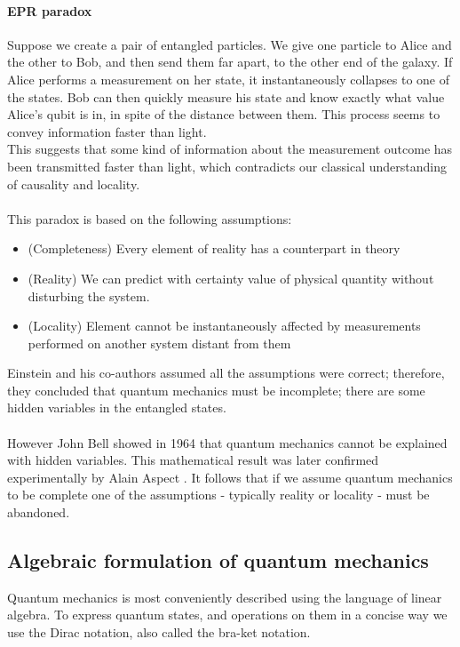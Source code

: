 \paragraph{EPR paradox}

Suppose we create a pair of entangled particles. We give one particle to Alice and the other to Bob, and then send them far apart, to the other end of the galaxy. If Alice performs a measurement on her state, it instantaneously collapses to one of the states. Bob can then quickly measure his state and know exactly what value Alice's qubit is in, in spite of the distance between them. This process seems to convey information faster than light.\\
This suggests that some kind of information about the measurement outcome has been transmitted faster than light, which contradicts our classical understanding of causality and locality.\\\\
This paradox is based on the following assumptions:
\begin{itemize}
    \item (Completeness) Every element of reality has a counterpart in theory
    \item (Reality) We can predict with certainty value of physical quantity without disturbing the system.
    \item (Locality) Element cannot be instantaneously affected by measurements performed on another system distant from them
\end{itemize}
Einstein and his co-authors assumed all the assumptions were correct; therefore, they concluded that quantum mechanics must be incomplete; there are some hidden variables in the entangled states.\\\\
However John Bell showed in 1964 \cite{bell} that quantum mechanics cannot be explained with hidden variables. This mathematical result was later confirmed experimentally by Alain Aspect \cite{aspect}. It follows that if we assume quantum mechanics to be complete one of the assumptions - typically reality or locality - must be abandoned.
\subsection{Algebraic formulation of quantum mechanics}
Quantum mechanics is most conveniently described using the language of linear algebra. To express quantum states, and operations on them in a concise way we use the Dirac notation, also called the bra-ket notation.
